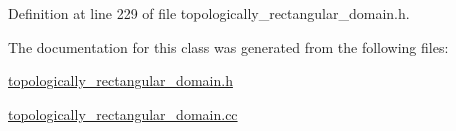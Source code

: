 Definition at line 229 of file topologically\+\_\+rectangular\+\_\+domain.\+h.



The documentation for this class was generated from the following files\+:\begin{DoxyCompactItemize}
\item 
\hyperlink{topologically__rectangular__domain_8h}{topologically\+\_\+rectangular\+\_\+domain.\+h}\item 
\hyperlink{topologically__rectangular__domain_8cc}{topologically\+\_\+rectangular\+\_\+domain.\+cc}\end{DoxyCompactItemize}
